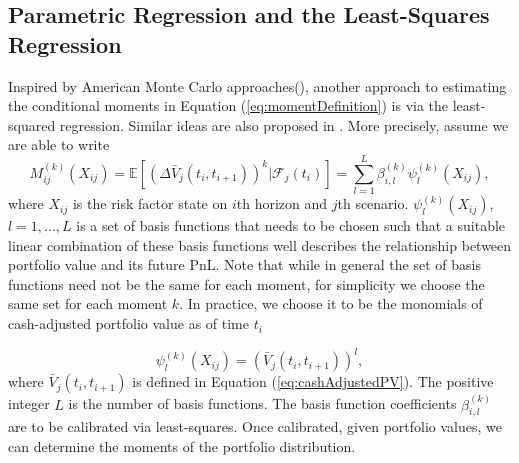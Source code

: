 \documentclass[preprint,12pt]{elsarticle}
\begin{document}
\subsection{Parametric Regression and the Least-Squares Regression}\label{s:ParametricRegression}
Inspired by American Monte Carlo approaches(\citep{longstaffSchwartz2001AMC}), another approach to estimating the conditional moments in Equation (\ref{eq:momentDefinition}) is via the least-squared regression. Similar ideas are also proposed in \citep{anfuso2016sound}. More precisely, assume we are able to write
\begin{equation}\label{eq:regressionAssumption}
M_{ij}^{(k)}(X_{ij})=\mathbb{E}\left[\left(\Delta\bar{V}_{j}(t_{i},t_{i+1})\right)^{k}|\mathcal{F}_{j}(t_{i})\right]=\sum_{l=1}^{L}\beta_{i,l}^{(k)}\psi_{l}^{(k)}(X_{ij}),
\end{equation}
where $X_{ij}$ is the risk factor state on $i$th horizon and $j$th scenario. $\psi_{l}^{(k)}(X_{ij})$, $l=1,...,L$ is a set of basis functions that needs to be chosen such that a suitable linear combination of these basis functions well describes the relationship between portfolio value and its future PnL. Note that while in general the set of basis functions need not be the same for each moment, for simplicity we choose the same set for each moment $k$. In practice, we choose it to be the monomials of cash-adjusted portfolio value as of time $t_{i}$

\begin{equation}
\psi_{l}^{(k)}(X_{ij})=\left(\bar{V}_{j}(t_{i},t_{i+1})\right)^{l},
\end{equation}
where $\bar{V}_{j}(t_{i},t_{i+1})$ is defined in Equation (\ref{eq:cashAdjustedPV}). The positive integer $L$ is the number of basis functions. The basis function coefficients $\beta_{i,l}^{(k)}$ are to be calibrated via least-squares. Once calibrated, given portfolio values, we can determine the moments of the portfolio distribution.
\end{document}

